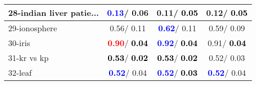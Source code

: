\begin{table}[h]
\begin{center}
\begin{tabular}{lc|c|c}
28-indian liver patie... & \textcolor{blue}{\textbf{  0.13}}/  0.06 &   0.11/\textcolor{black}{\textbf{  0.05}} &   0.12/\textcolor{black}{\textbf{  0.05}} \\ \hline
29-ionosphere &   0.56/  0.11 & \textcolor{blue}{\textbf{  0.62}}/  0.11 &   0.59/  0.09 \\
30-iris & \textcolor{red}{\textbf{  0.90}}/\textcolor{black}{\textbf{  0.04}} & \textcolor{blue}{\textbf{  0.92}}/\textcolor{black}{\textbf{  0.04}} &   0.91/\textcolor{black}{\textbf{  0.04}} \\
31-kr vs kp & \textcolor{black}{\textbf{  0.53}}/\textcolor{black}{\textbf{  0.02}} & \textcolor{black}{\textbf{  0.53}}/\textcolor{black}{\textbf{  0.02}} &   0.52/  0.03 \\
32-leaf & \textcolor{blue}{\textbf{  0.52}}/  0.04 & \textcolor{blue}{\textbf{  0.52}}/\textcolor{black}{\textbf{  0.03}} & \textcolor{blue}{\textbf{  0.52}}/  0.04 \\\end{tabular}\label{stratsALCKappa0b5NNRedux}
\end{center}
\end{table}
